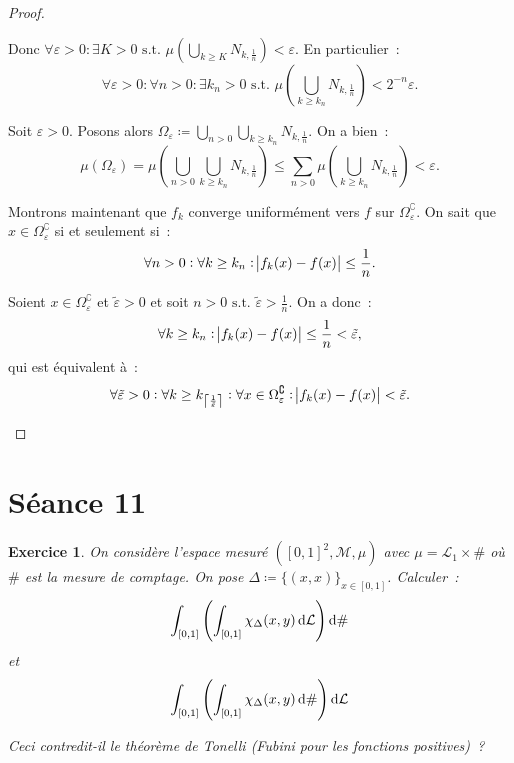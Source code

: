 \documentclass{article}
\newtheorem{ex}{Exercice}[section]
\theoremstyle{definition}
\newcommand{\st}{\text{ s.t. }}
\newcommand{\C}{\complement}
\begin{document}
\begin{proof}
\begin{enumerate}
	Donc $\forall \varepsilon > 0 : \exists K > 0 \st \mu(\bigcup_{k \geq K}N_{k,\frac 1n}) < \varepsilon$. En particulier~:
	\[\forall \varepsilon > 0 : \forall n > 0 : \exists k_n > 0 \st \mu\left(\bigcup_{k \geq k_n}N_{k,\frac 1n}\right) < 2^{-n}\varepsilon.\]

	Soit $\varepsilon > 0$. Posons alors $\Omega_\varepsilon \coloneqq \bigcup_{n > 0}\bigcup_{k \geq k_n}N_{k,\frac 1n}$. On a bien~:
	\[\mu(\Omega_\varepsilon) = \mu\left(\bigcup_{n > 0}\bigcup_{k \geq k_n}N_{k,\frac 1n}\right) \leq \sum_{n > 0}\mu\left(\bigcup_{k \geq k_n}N_{k,\frac 1n}\right) < \varepsilon.\]

	Montrons maintenant que $f_k$ converge uniformément vers $f$ sur $\Omega_\varepsilon^\C$. On sait que $x \in \Omega_\varepsilon^\C$ si et seulement si~:
	\[\forall n > 0 : \forall k \geq k_n : \abs {f_k(x)-f(x)} \leq \frac 1n.\]

	Soient $x \in \Omega_\varepsilon^\C$ et $\tilde \varepsilon > 0$ et soit $n > 0 \st \tilde \varepsilon > \frac 1n$. On a donc~:
	\[\forall k \geq k_n : \abs {f_k(x)-f(x)} \leq \frac 1n < \tilde \varepsilon,\]
	qui est équivalent à~:
	\[\forall \tilde \varepsilon > 0 : \forall k \geq k_{\left\lceil\frac 1{\tilde \varepsilon}\right\rceil} : \forall x \in \Omega_\varepsilon^\C : \abs {f_k(x)-f(x)} < \tilde\varepsilon.\]
\end{enumerate}
\end{proof}

\newpage
\section{Séance 11}

\begin{ex} On considère l'espace mesuré $([0, 1]^2, \mathcal M, \mu)$ avec $\mu = \mathcal L_1 \times \#$ où $\#$ est la mesure de comptage. On pose
$\Delta \coloneqq \{(x, x)\}_{x \in [0, 1]}$. Calculer~:
\[\int_{[0, 1]}\left(\int_{[0, 1]}\chi_\Delta(x, y)\dif\mathcal L\right)\dif\#\]
et
\[\int_{[0, 1]}\left(\int_{[0, 1]}\chi_\Delta(x, y)\dif\#\right)\dif\mathcal L\]

Ceci contredit-il le théorème de Tonelli (Fubini pour les fonctions positives)~?
\end{ex}
\end{document}
